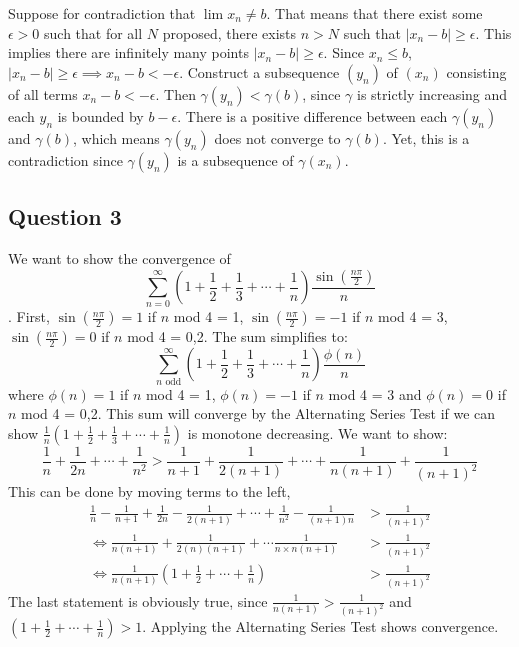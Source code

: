 \documentclass{article}
\begin{document}

Suppose for contradiction that $\lim x_n \neq b$. That means that there exist some $\epsilon>0$ such that for all $N$ proposed, there exists $n>N$ such that $|x_n -b|\geq \epsilon$. This implies there are infinitely many points $|x_n -b|\geq \epsilon$. Since $x_n \leq b$, $|x_n -b|\geq \epsilon \implies x_n-b<-\epsilon$. Construct a subsequence $(y_n)$ of $(x_n)$ consisting of all terms $x_n-b<-\epsilon$. Then $\gamma(y_n) < \gamma(b)$, since $\gamma$ is strictly increasing and each $y_n$ is bounded by $b-\epsilon$. There is a positive difference between each $\gamma(y_n)$ and $\gamma(b)$, which means $\gamma(y_n)$ does not converge to $\gamma(b)$. Yet, this is a contradiction since $\gamma(y_n)$ is a subsequence of $\gamma(x_n)$.

\subsection*{Question 3}
We want to show the convergence of $$\sum_{n=0}^{\infty} \left(1+\frac{1}{2}+\frac{1}{3} + \cdots + \frac{1}{n}\right) \frac{\sin(\frac{n\pi}{2})}{n}$$.
First, $\sin(\frac{n\pi}{2})=1$ if $n$ mod 4 = 1, $\sin(\frac{n\pi}{2})=-1$ if $n$ mod 4 = 3, $\sin(\frac{n\pi}{2})=0$ if $n$ mod 4 = 0,2. The sum simplifies to:
\begin{equation*}
    \sum_{\text{$n$ odd}}^{\infty} \left(1+\frac{1}{2}+\frac{1}{3} + \cdots + \frac{1}{n}\right) \frac{\phi(n)}{n}
\end{equation*}
where $\phi(n)=1$ if $n$ mod 4 = 1, $\phi(n)=-1$ if $n$ mod 4 = 3 and $\phi(n)=0$ if $n$ mod 4 = 0,2. This sum will converge by the Alternating Series Test if we can show $\frac{1}{n}\left(1+\frac{1}{2}+\frac{1}{3} + \cdots + \frac{1}{n}\right)$ is monotone decreasing. We want to show:
\begin{equation*}
    \frac{1}{n} + \frac{1}{2n} + \cdots + \frac{1}{n^2} > \frac{1}{n+1} + \frac{1}{2(n+1)} + \cdots + \frac{1}{n(n+1)} + \frac{1}{(n+1)^2}
\end{equation*}
This can be done by moving terms to the left,
\begin{align*}
    \frac{1}{n} - \frac{1}{n+1} + \frac{1}{2n} - \frac{1}{2(n+1)} + \cdots + \frac{1}{n^2} - \frac{1}{(n+1)n} &> \frac{1}{(n+1)^2} \\
    \iff \frac{1}{n(n+1)} + \frac{1}{2(n)(n+1)} + \cdots \frac{1}{n \times n(n+1)} &> \frac{1}{(n+1)^2} \\
    \iff \frac{1}{n(n+1)} \left( 1+\frac{1}{2}+ \cdots + \frac{1}{n}\right) &> \frac{1}{(n+1)^2}
\end{align*}
The last statement is obviously true, since $\frac{1}{n(n+1)}> \frac{1}{(n+1)^2}$ and $\left( 1+\frac{1}{2}+ \cdots + \frac{1}{n}\right)>1$. Applying the Alternating Series Test shows convergence.
\end{document}
